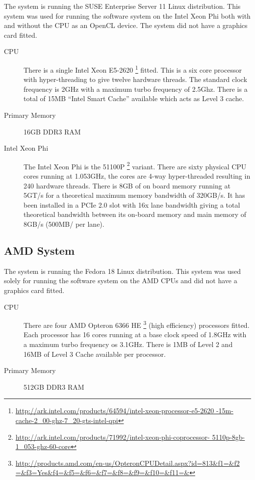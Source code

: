 The system is running the SUSE Enterprise Server 11 Linux distribution. This
system was used for running the software system on the Intel Xeon Phi both with
and without the CPU as an OpenCL device. The system did not have a graphics card
fitted.

\begin{description}

\item[CPU] There is a single Intel Xeon E5-2620
\footnote{\url{http://ark.intel.com/products/64594/intel-xeon-processor-e5-2620
-15m-cache-2_00-ghz-7_20-gts-intel-qpi}} fitted. This is a six core processor
with hyper-threading to give twelve hardware threads. The standard clock
frequency is 2GHz with a maximum turbo frequency of 2.5Ghz. There is a total of
15MB ``Intel Smart Cache'' available which acts as Level 3 cache.

\item[Primary Memory] 16GB DDR3 RAM

\item[Intel Xeon Phi] The Intel Xeon Phi is the 51100P
\footnote{\url{http://ark.intel.com/products/71992/intel-xeon-phi-coprocessor-
5110p-8gb-1_053-ghz-60-core}} variant. There are sixty physical CPU cores
running at 1.053GHz, the cores are 4-way hyper-threaded resulting in 240
hardware threads. There is 8GB of on board memory running at 5GT/s for a
theoretical maximum memory bandwidth of 320GB/s. It has been installed in a PCIe
2.0 slot with 16x lane bandwidth giving a total theoretical bandwidth between
its on-board memory and main memory of 8GB/s (500MB/ per lane).

\end{description}

\subsection{AMD System}

The system is running the Fedora 18 Linux distribution. This system was used
solely for running the software system on the AMD CPUs and did not have a
graphics card fitted.

\begin{description}

\item[CPU] There are four AMD Opteron 6366 HE
\footnote{\url{http://products.amd.com/en-us/OpteronCPUDetail.aspx?id=813&f1=&f2
=&f3=Yes&f4=&f5=&f6=&f7=&f8=&f9=&f10=&f11=&}} (high efficiency) processors
fitted. Each processor has 16 cores running at a base clock speed of 1.8GHz with
a maximum turbo frequency os 3.1GHz. There is 1MB of Level 2 and 16MB of Level 3
Cache available per processor.

\item[Primary Memory] 512GB DDR3 RAM

\end{description}

